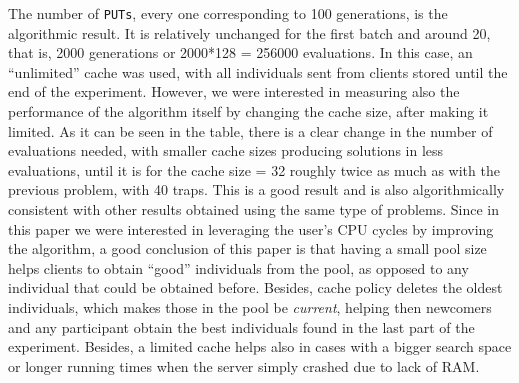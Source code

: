\documentclass[letterpaper]{article}
\begin{document}
The number of {\tt PUTs}, every one corresponding to 100 generations,
is the algorithmic result. It is relatively unchanged for the first
batch and around 20, that is, 2000 generations or 2000*128 = 256000
evaluations. In this case, an ``unlimited'' cache was used, with all
individuals sent from clients stored until the end of the
experiment. However, we were interested in measuring also the
performance of the algorithm itself by changing the cache size, after
making it limited. As it can be seen in the table, there is a clear
change in the number of evaluations needed, with smaller cache sizes
producing solutions in less evaluations, until it is for the cache
size = 32 roughly twice as much as with the previous problem, with 40
traps. This is a good result and is also algorithmically consistent
with other results obtained using the same type of problems. Since in
this paper we were interested in leveraging the user's CPU cycles by
improving the algorithm, a good conclusion of this paper is that
having a small pool size helps clients to obtain ``good'' individuals
from the pool, as opposed to any individual that could be obtained
before. Besides, cache policy deletes the oldest individuals, which
makes those in the pool be {\em current}, helping then newcomers and
any participant obtain the best individuals found in the last part of
the experiment. Besides, a limited cache helps also in cases with a
bigger search space or longer running times when the server simply
crashed due to lack of RAM. 
\end{document}
